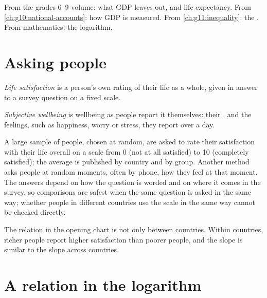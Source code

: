 \begin{recall}
From the grades 6--9 volume: what GDP leaves out, and life expectancy. From \cref{ch:g10:national-accounts}: how GDP is measured. From \cref{ch:g11:inequality}: the . From mathematics: the logarithm.
\end{recall}

\section{Asking people}\label{sec:g12:income-and-wellbeing:asking}

\begin{definition}\label{def:g12:income-and-wellbeing:life-satisfaction}
\emph{Life satisfaction} is a person's own rating of their life as a whole, given in answer to a survey question on a fixed scale.
\end{definition}

\begin{definition}\label{def:g12:income-and-wellbeing:subjective-wellbeing}
\emph{Subjective wellbeing} is wellbeing as people report it themselves: their , and the feelings, such as happiness, worry or
stress, they report over a day.
\end{definition}

\begin{measure}
A large sample of people, chosen at random, are asked to rate their satisfaction with their life overall on a scale from 0 (not at all satisfied) to 10 (completely
satisfied); the average is published by country and by group. Another method asks people at random moments, often by phone, how they feel at that moment. The answers depend on
how the question is worded and on where it comes in the survey, so comparisons are safest when the same question is asked in the same way; whether people in different
countries use the scale in the same way cannot be checked directly.
\end{measure}

The relation in the opening chart is not only between countries. Within countries, richer people report higher satisfaction than poorer people, and the slope is similar to the
slope across countries.

\section{A relation in the logarithm}\label{sec:g12:income-and-wellbeing:log}

